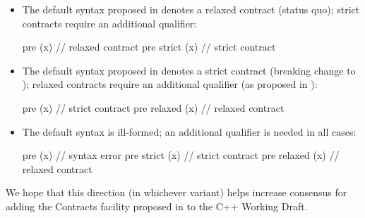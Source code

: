 \begin{itemize}
\item The default syntax proposed in \cite{P2900R11} denotes a relaxed contract (status quo); strict contracts require an additional qualifier:
\begin{codeblock}
pre (x)         // relaxed contract
pre strict (x)  // strict contract
\end{codeblock}
\item The default syntax proposed in \cite{P2900R11} denotes a strict contract (breaking change to \cite{P2900R11}); relaxed contracts require an additional qualifier (as proposed in \cite{P3285R0}):
\begin{codeblock}
pre (x)         // strict contract
pre relaxed (x) // relaxed contract
\end{codeblock}
\item The default syntax is ill-formed; an additional qualifier is needed in all cases:
\begin{codeblock}
pre (x)         // syntax error
pre strict (x)  // strict contract
pre relaxed (x) // relaxed contract
\end{codeblock}
\end{itemize}

We hope that this direction (in whichever variant) helps increase consensus for adding the Contracts facility proposed in \cite{P2900R11} to the C++ Working Draft.




\renewcommand{\addcontentsline}[3]{}%







